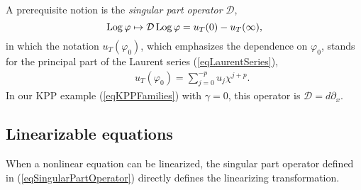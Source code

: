 \documentclass[10pt]{article}
\begin{document}
A prerequisite notion is 
the \textit{singular part operator} ${\mathcal D}$,
\begin{equation}
\mathop{\rm Log}\nolimits \varphi \mapsto {\mathcal D} \mathop{\rm Log}\nolimits \varphi=u_T(0)-u_T(\infty),
\label{eqSingularPartOperator}
\end{equation}
in which the notation $u_T(\varphi_0)$,
which emphasizes the dependence on $\varphi_0$,
stands for the principal part of the Laurent series
(\ref{eqLaurentSeries}),
\begin{eqnarray}
& &
u_T(\varphi_0) = \sum^{-p}_{j=0} u_j \chi^{j+p}.
\label{eqLaurentSeriesTruncated}
\end{eqnarray}
In our KPP example (\ref{eqKPPFamilies}) with $\gamma=0$,
this operator is
${\mathcal D}=d \partial_x$.

\subsection{Linearizable equations} 
\label{sectionLinearization}

When a nonlinear equation can be linearized,
the singular part operator
defined in (\ref{eqSingularPartOperator})
directly defines the linearizing transformation.
\end{document}

